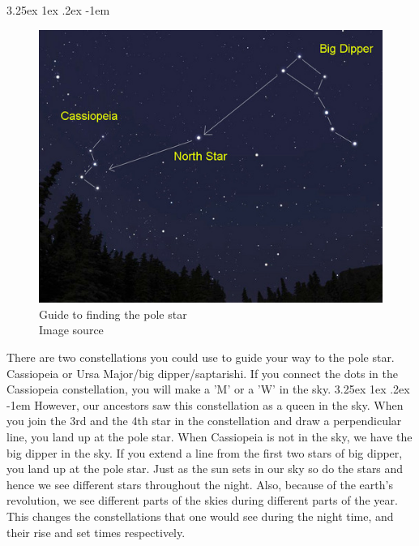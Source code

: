 \documentclass[a4paper,twoside,11pt]{article}
\makeatletter
\numberwithin{equation}{section}
\renewcommand\paragraph{\@startsection{paragraph}{5}{\z@}%
  {3.25ex \@plus1ex \@minus.2ex}%
  {-1em}%
  {\normalfont\normalsize\bfseries}}
\makeatother
\begin{document}
\paragraph{}
\begin{figure}
\includegraphics[width=1\linewidth]{fig13.jpg} 
\caption{Guide to finding the pole star \\ Image source \cite{WhichwayQueen}}
\label{fig13}
\end{figure}
There are two constellations you could use to guide your way to the pole star. Cassiopeia or Ursa Major/big dipper/saptarishi. If you connect the dots in the Cassiopeia constellation, you will make a 'M’ or a 'W’ in the sky.
\paragraph{}
However, our ancestors saw this constellation as a queen in the sky. When you join the 3rd and the 4th star in the constellation and draw a perpendicular line, you land up at the pole star. When Cassiopeia is not in the sky, we have the big dipper in the sky. If you extend a line from the first two stars of big dipper, you land up at the pole star. Just as the sun sets in our sky so do the stars and hence we see different stars throughout the night. Also, because of the earth's revolution, we see different parts of the skies during different parts of the year. This changes the constellations that one would see during the night time, and their rise and set times respectively. \\
\end{document}
